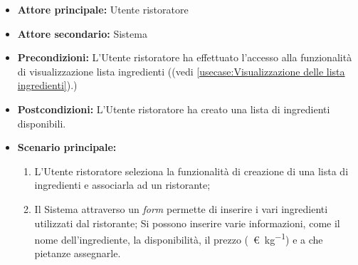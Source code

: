 \label{usecase:Creazione di una lista ingredienti}
\begin{itemize}
	\item \textbf{Attore principale:} Utente ristoratore

	\item \textbf{Attore secondario:} Sistema

	\item \textbf{Precondizioni:} L'Utente ristoratore ha effettuato l'accesso
	      alla funzionalità di visualizzazione lista ingredienti 
		  ((vedi \autoref{usecase:Visualizzazione delle lista ingredienti}).)

	\item \textbf{Postcondizioni:}
	      L'Utente ristoratore ha creato una lista di ingredienti disponibili.

	\item \textbf{Scenario principale:}
	      \begin{enumerate}
		      \item L'Utente ristoratore seleziona la funzionalità di
		            creazione di una lista di ingredienti e associarla ad un ristorante;

		      \item Il Sistema attraverso un \textit{form} permette di inserire i vari ingredienti utilizzati dal ristorante;
					Si possono inserire varie informazioni, come il nome dell'ingrediente, la disponibilità, il prezzo (\SI{}{\euro\per\kilo\gram}) e a che pietanze assegnarle.
	      \end{enumerate}
\end{itemize}
